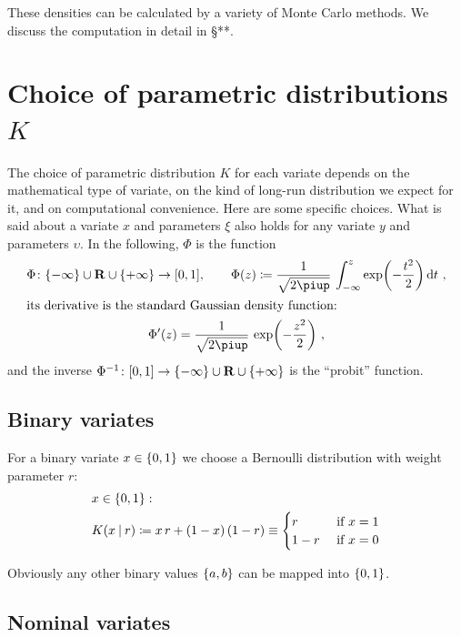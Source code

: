 \documentclass[\ifafour a4paper,12pt,\else a5paper,10pt,\fi%
onecolumn,oneside,article,%
british%
]{memoir}
\theoremstyle{remark}
\theoremstyle{innote}
\newcommand*{\pu}{\piup}%
\newcommand*{\di}{\mathrm{d}}%
\newcommand*{\RR}{\bm{\mathrm{R}}}
\newcommand*{\defd}{\coloneqq}
\DeclarePairedDelimiter\clcl{[}{]}
\DeclarePairedDelimiter\set{\{}{\}} %
\renewcommand*{\|}[1][]{\nonscript\:#1\vert\nonscript\:\mathopen{}}
\newcommand*{\sect}{\S}%
\begin{document}
These densities can be calculated by a variety of Monte Carlo methods. We discuss the computation in detail in \sect***.

\section{Choice of parametric distributions $K$}
\label{sec:choice_K}

The choice of parametric distribution $K$ for each variate depends on the mathematical type of variate, on the kind of long-run distribution we expect for it, and on computational convenience. Here are some specific choices. What is said about a variate $x$ and parameters $\xi$ also holds for any variate $y$ and parameters $\upsilon$. In the following, $\Phi$ is the function
\begin{gather}
  \label{eq:Phi}
  \Phi \colon  \set{-\infty}\cup\RR\cup\set{+\infty}\to\clcl{0,1},
  \qquad
  \Phi(z) \defd \frac{1}{\sqrt{2\pu}}\, \int_{-\infty}^{z} \exp\biggl(-\frac{t^{2}}{2}\biggr)\, \di t \ ,
  \\\shortintertext{its derivative is the standard Gaussian density function:}
  \Phi'(z) =  \frac{1}{\sqrt{2\pu}}\,\exp\biggl(-\frac{z^{2}}{2}\biggr) \ ,
\end{gather}
and the inverse $\Phi^{-1}\colon \clcl{0,1}\to\set{-\infty}\cup\RR\cup\set{+\infty}$ is the \enquote{probit} function.



\subsection{Binary variates}
\label{sec:variates_binary}

For a binary variate $x \in \set{0,1}$ we choose a Bernoulli distribution with weight parameter $r$:
\begin{equation}
  \label{eq:K_bin}
  \begin{split}
    &x \in \set{0,1}:
\\
    &K(x \| r) \defd x\, r + (1-x)\,(1-r) \equiv
  \begin{cases}
    r&\text{ if $x=1$} \\1-r&\text{ if $x=0$}
  \end{cases}
\end{split}
\end{equation}

Obviously any other binary values $\set{a,b}$ can be mapped into $\set{0,1}$.

\subsection{Nominal variates}
\label{sec:variates_nominal}
\end{document}
